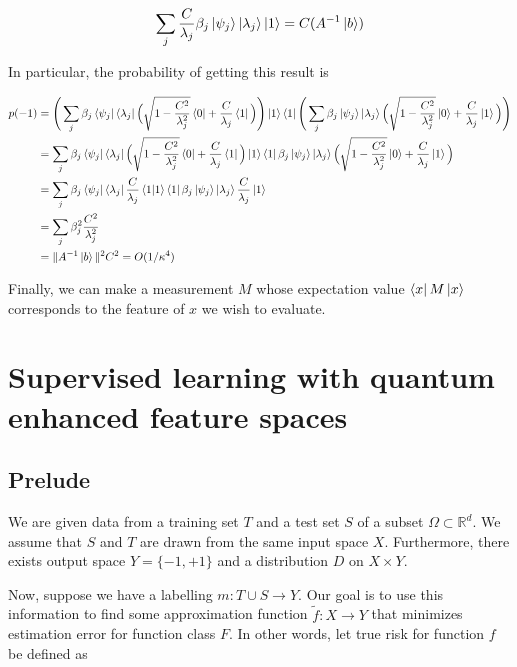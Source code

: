 \documentclass[11pt]{article}
\newcommand\0{\mathbf{0}}
\newcommand\RR{\mathbb{R}}
\newcommand\<{\langle}
\renewcommand\>{\rangle}
\begin{document}
\begin{align*}
	\sum_j \frac{C}{\lambda_j} \beta_j \ket{\psi_j} \ket{\lambda_j}\ket{1} = C (A^{-1} \ket{b})
\end{align*}

In particular, the probability of getting this result is 

\begin{align*} 
	p(-1) &= \Bigg(\sum_j \beta_j \bra{\psi_j} \bra{\lambda_j} \Big(\sqrt{1-\frac{C^2}{\lambda_j^2}}\bra{0} + \frac{C}{\lambda_j}\bra{1}\Big) \Bigg)\ket{1}\bra{1} \Bigg(\sum_j \beta_j \ket{\psi_j} \ket{\lambda_j} \Big(\sqrt{1-\frac{C^2}{\lambda_j^2}}\ket{0} + \frac{C}{\lambda_j}\ket{1}\Big)\Bigg) \\
	&= \sum_j \beta_j \bra{\psi_j} \bra{\lambda_j} \Big(\sqrt{1-\frac{C^2}{\lambda_j^2}}\bra{0} + \frac{C}{\lambda_j}\bra{1}\Big) \ket{1}\bra{1} \beta_j \ket{\psi_j} \ket{\lambda_j} \Big(\sqrt{1-\frac{C^2}{\lambda_j^2}}\ket{0} + \frac{C}{\lambda_j}\ket{1}\Big) \\
	&= \sum_j \beta_j \bra{\psi_j} \bra{\lambda_j} \frac{C}{\lambda_j}\bra{1}\ket{1}\bra{1} \beta_j \ket{\psi_j} \ket{\lambda_j} \frac{C}{\lambda_j}\ket{1} \\
	&= \sum_j \beta_j^2 \frac{C^2}{\lambda_j^2} \\
	&= \| A^{-1} \ket{b} \|^2 C^2 = O(1/\kappa^4)
\end{align*} 

Finally, we can make a measurement $M$ whose expectation value $\bra{x}M\ket{x}$ corresponds to the feature of $x$ we wish to evaluate. 

\section{Supervised learning with quantum enhanced feature spaces}

\subsection{Prelude}

We are given data from a training set $T$ and a test set $S$ of a subset $\Omega \subset \RR^d$. We assume that $S$ and $T$ are drawn from the same input space $X$. Furthermore, there exists output space $Y = \{ -1, +1 \} $ and a distribution $D$ on $X \times Y$.

Now, suppose we have a labelling $m: T \cup S \rightarrow Y$.  Our goal is to use this information to find some approximation function $\tilde{f} : X \rightarrow Y$ that minimizes estimation error for function class $F$. In other words, let true risk for function $f$ be defined as
\end{document}
